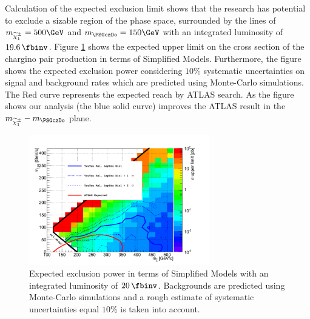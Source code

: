 Calculation of the expected exclusion limit shows that the research has potential to exclude 
a sizable region of the phase space, surrounded by the lines of $m_{\PSGcpmDo} = 500\GeV$ and $m_{\PSGczDo} = 150\GeV$ with an integrated luminosity of $19.6\,\fbinv$.
Figure \ref{fig:limit_final} shows the expected upper limit on the cross section of the chargino pair production in terms of Simplified Models. 
Furthermore, the figure shows the expected exclusion power considering 
$10\%$ systematic uncertainties on signal and background rates which are predicted using Monte-Carlo simulations. 
The Red curve represents the expected reach by ATLAS %
 search. As the figure shows our analysis (the blue solid curve) improves the ATLAS result in the $m_{\PSGcpmDo}-m_{\PSGczDo}$ plane.

\begin{linenomath}
\begin{figure}[h]
\centering
\includegraphics[width=0.7\textwidth,keepaspectratio=true]{StatisticsFig/NewFigs/Final_4BinRel.png}
\caption{Expected exclusion power in terms of Simplified Models %
with an integrated luminosity of $20\,\fbinv$. Backgrounds are predicted using Monte-Carlo simulations and a rough estimate of systematic uncertainties equal 
$10\%$ is taken into account.}
\label{fig:limit_final}
\end{figure}
\end{linenomath}




